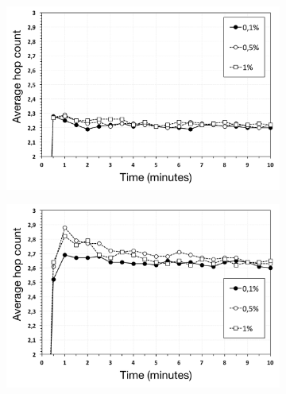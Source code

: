 \begin{figure}
\centering
\begin{subfigure}{.5\textwidth}
  \centering
  \includegraphics[keepaspectratio=true, width=1\linewidth]{images/average_hop_count_churn_1impl}
  \caption{}
  \label{fig:average_hop_count_churn_1impl}
\end{subfigure}%
\begin{subfigure}{.5\textwidth}
  \centering
  \includegraphics[keepaspectratio=true, width=1\linewidth]{images/average_hop_count_churn_2impl}
  \caption{}
  \label{fig:average_hop_count_churn_2impl}
\end{subfigure}
\begin{subfigure}{.5\textwidth}
  \centering

\end{subfigure}
\end{figure}

